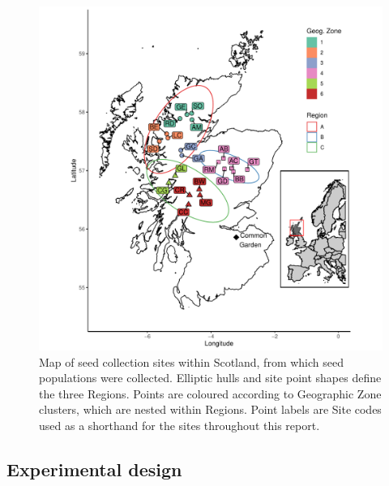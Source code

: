 \documentclass[a4paper, 11pt]{article}
\begin{document}
\begin{figure}[H]
	\includegraphics[width=\textwidth]{site_map}
	\caption{Map of seed collection sites within Scotland, from which seed populations were collected. Elliptic hulls and site point shapes define the three Regions. Points are coloured according to Geographic Zone clusters, which are nested within Regions. Point labels are Site codes used as a shorthand for the sites throughout this report.} 
	\label{site_map}
\end{figure}

\subsection*{Experimental design}
\end{document}
